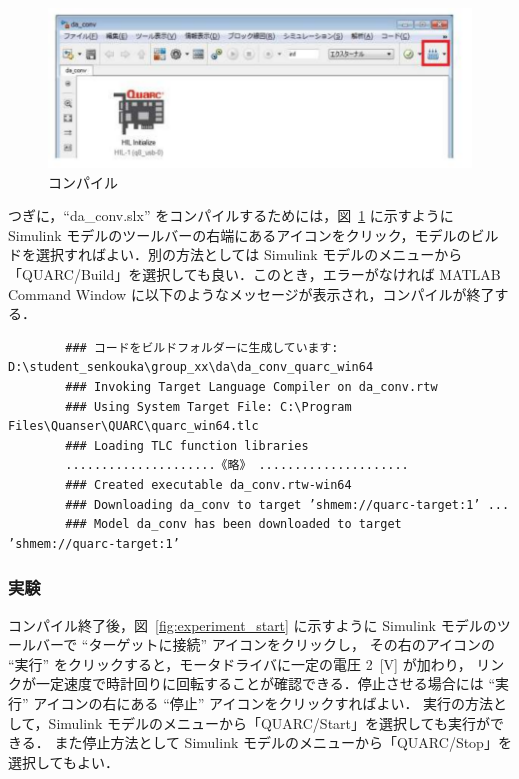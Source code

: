     \begin{figure}[H]
        \centering
        \includegraphics[width=0.8\linewidth]{figure/compile_button.pdf}
        \caption{コンパイル}
        \label{fig:compile_button}
    \end{figure}
    
    つぎに，“da\_conv.slx” をコンパイルするためには，図~\ref{fig:compile_button} に示すように Simulink モデルのツールバーの右端にあるアイコンをクリック，モデルのビルドを選択すればよい．別の方法としては Simulink モデルのメニューから「QUARC/Build」を選択しても良い．このとき，エラーがなければ MATLAB Command Window に以下のようなメッセージが表示され，コンパイルが終了する．

    \begin{tcolorbox}[colback=white, colframe=black, boxrule=0.5pt, sharp corners]
        \footnotesize
        \begin{verbatim}
        ### コードをビルドフォルダーに生成しています: D:\student_senkouka\group_xx\da\da_conv_quarc_win64
        ### Invoking Target Language Compiler on da_conv.rtw
        ### Using System Target File: C:\Program Files\Quanser\QUARC\quarc_win64.tlc
        ### Loading TLC function libraries
        .....................《略》 .....................
        ### Created executable da_conv.rtw-win64
        ### Downloading da_conv to target ’shmem://quarc-target:1’ ...
        ### Model da_conv has been downloaded to target ’shmem://quarc-target:1’
        \end{verbatim}
        \end{tcolorbox}

        \subsubsection{実験}

        コンパイル終了後，図~\ref{fig:experiment_start} に示すように Simulink モデルのツールバーで “ターゲットに接続” アイコンをクリックし，
        その右のアイコンの “実行” をクリックすると，モータドライバに一定の電圧 2~[V] が加わり，
        リンクが一定速度で時計回りに回転することが確認できる．停止させる場合には “実行” アイコンの右にある “停止” アイコンをクリックすればよい．
        実行の方法として，Simulink モデルのメニューから「QUARC/Start」を選択しても実行ができる．
        また停止方法として Simulink モデルのメニューから「QUARC/Stop」を選択してもよい．
        
